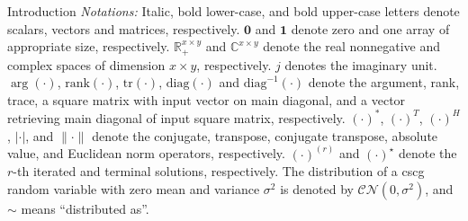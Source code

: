 \documentclass[journal]{IEEEtran}
\begin{document}
\begin{section}{Introduction}
	\emph{Notations:}
	Italic, bold lower-case, and bold upper-case letters denote scalars, vectors and matrices, respectively.
	$\boldsymbol{0}$ and $\boldsymbol{1}$ denote zero and one array of appropriate size, respectively.
	$\mathbb{R}_+^{x \times y}$ and $\mathbb{C}^{x \times y}$ denote the real nonnegative and complex spaces of dimension $x \times y$, respectively.
	$j$ denotes the imaginary unit.
	$\arg(\cdot)$, $\mathrm{rank}(\cdot)$, $\mathrm{tr}(\cdot)$, $\mathrm{diag}(\cdot)$ and $\mathrm{diag}^{-1}(\cdot)$ denote the argument, rank, trace, a square matrix with input vector on main diagonal, and a vector retrieving main diagonal of input square matrix, respectively.
	$(\cdot)^*$, $(\cdot)^T$, $(\cdot)^H$, $\lvert{\cdot}\rvert$, and $\lVert{\cdot}\rVert$ denote the conjugate, transpose, conjugate transpose, absolute value, and Euclidean norm operators, respectively.
	$(\cdot)^{(r)}$ and $(\cdot)^{\star}$ denote the $r$-th iterated and terminal solutions, respectively.
	The distribution of a \gls{cscg} random variable with zero mean and variance $\sigma^2$ is denoted by $\mathcal{CN}(0,\sigma^2)$, and $\sim$ means ``distributed as''.
\end{section}
\end{document}
